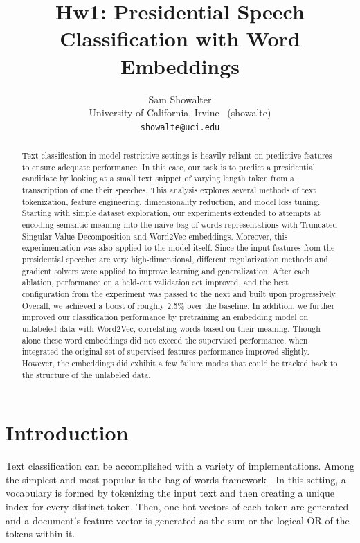 \documentclass[11pt,a4paper]{article}
\title{Hw1: Presidential Speech Classification with Word Embeddings}
\author{Sam Showalter \\
  University of California, Irvine \ (showalte) \\  
\texttt{showalte@uci.edu}}
\date{}
\begin{document}
\maketitle
\begin{abstract}
  Text classification in model-restrictive settings is heavily reliant on predictive features to ensure adequate performance. In this case, our task is to predict a presidential candidate by looking at a small text snippet of varying length taken from a transcription of one their speeches. This analysis explores several methods of text tokenization, feature engineering, dimensionality reduction, and model loss tuning. Starting with simple dataset exploration, our experiments extended to attempts at encoding semantic meaning into the naive bag-of-words representations with Truncated Singular Value Decomposition and Word2Vec embeddings.
  Moreover, this experimentation was also applied to the model itself. Since the input features from the presidential speeches are very high-dimensional, different regularization methods and gradient solvers were applied to improve learning and generalization. After each ablation, performance on a held-out validation set improved, and the best configuration from the experiment was passed to the next and built upon progressively. Overall, we achieved a boost of roughly 2.5\% over the baseline.
  In addition, we further improved our classification performance by pretraining an embedding model on unlabeled data with Word2Vec, correlating words based on their meaning. Though alone these word embeddings did not exceed the supervised performance, when integrated the original set of supervised features performance improved slightly. However, the embeddings did exhibit a few failure modes that could be tracked back to the structure of the unlabeled data.  
\end{abstract}


\section{Introduction}

Text classification can be accomplished with a variety of implementations. Among the simplest and most popular is the bag-of-words framework \cite{zhang2010understanding}. In this setting, a vocabulary is formed by tokenizing the input text and then creating a unique index for every distinct token. Then, one-hot vectors of each token are generated and a document's feature vector is generated as the sum or the logical-OR of the tokens within it.
\end{document}

